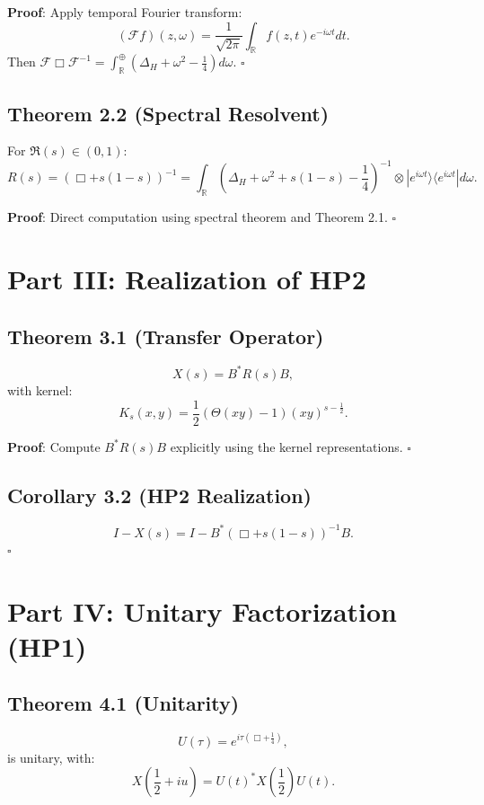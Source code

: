 \documentclass{article}
\begin{document}
\textbf{Proof}: Apply temporal Fourier transform:
\[
(\mathcal{F} f)(z,\omega) = \frac{1}{\sqrt{2\pi}} \int_{\mathbb{R}} f(z,t) e^{-i\omega t} dt.
\]
Then \( \mathcal{F} \Box \mathcal{F}^{-1} = \int_{\mathbb{R}}^\oplus (\Delta_H + \omega^2 - \tfrac{1}{4}) d\omega \). \hfill \( \square \)

\subsection{Theorem 2.2 (Spectral Resolvent)}
For \( \Re(s) \in (0,1) \):
\[
R(s) = (\Box + s(1-s))^{-1} = \int_{\mathbb{R}} \left( \Delta_H + \omega^2 + s(1-s) - \frac{1}{4} \right)^{-1} \otimes |e^{i\omega t}\rangle \langle e^{i\omega t}| d\omega.
\]

\textbf{Proof}: Direct computation using spectral theorem and Theorem 2.1. \hfill \( \square \)

\section{Part III: Realization of HP2}

\subsection{Theorem 3.1 (Transfer Operator)}
\[
X(s) = B^* R(s) B,
\]
with kernel:
\[
K_s(x,y) = \frac{1}{2} (\Theta(xy) - 1) (xy)^{s - \frac{1}{2}}.
\]

\textbf{Proof}: Compute \( B^* R(s) B \) explicitly using the kernel representations. \hfill \( \square \)

\subsection{Corollary 3.2 (HP2 Realization)}
\[
I - X(s) = I - B^* (\Box + s(1-s))^{-1} B.
\]
\hfill \( \square \)

\section{Part IV: Unitary Factorization (HP1)}

\subsection{Theorem 4.1 (Unitarity)}
\[
U(\tau) = e^{i\tau \left( \Box + \frac{1}{4} \right)},
\]
is unitary, with:
\[
X\left( \frac{1}{2} + iu \right) = U(t)^* X\left( \frac{1}{2} \right) U(t).
\]
\end{document}
